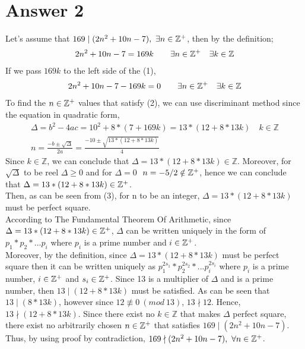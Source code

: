 \documentclass[12pt]{article}
\newcommand{\Z}{\mathbb{Z}}
\begin{document}
\section*{Answer 2}
Let's assume that $169 \mid (2n^2+10n-7),\ \exists n\in \Z\textsuperscript{+}$, then by the definition;
\begin{equation}
\begin{split}
2n^2+10n-7 = 169k \qquad \exists n\in \Z\textsuperscript{+} \quad \exists k \in \Z
\end{split}
\end{equation}
If we pass $169k$ to the left side of the (1),
\begin{equation}
\begin{split}
2n^2+10n-7-169k = 0 \qquad \exists n\in \Z\textsuperscript{+} \quad \exists k \in \Z
\end{split}
\end{equation}
To find the $n\in \Z\textsuperscript{+}$ values that satisfy (2), we can use discriminant method since the equation in quadratic form,
\begin{equation}
\begin{split}
\Delta = b^2-4ac = 10^2+8*(7+169k) = 13*(12 +8*13k) \quad k \in \Z \\
n = \frac{-b \pm \sqrt{\Delta}}{2a} = \frac{-10 \pm \sqrt{13*(12 +8*13k)}}{4} \qquad \qquad
\end{split}
\end{equation}
Since $k\in \Z$, we can conclude that $\Delta = 13*(12 +8*13k)\in \Z$. Moreover, for $\sqrt{\Delta}$ to be reel $\Delta \geq 0$ and for $\Delta = 0$ $\ n = -5/2 \notin \Z\textsuperscript{+}$, hence we can conclude that $\Delta = 13*(12 +8*13k)\in \Z\textsuperscript{+}$. \\
Then, as can be seen from (3), for n to be an integer, $\Delta = 13*(12 +8*13k)$ must be perfect square. \\
According to The Fundamental Theorem Of Arithmetic, since $\Delta = 13*(12 +8*13k)\in \Z\textsuperscript{+}$, $\Delta$ can be written uniquely in the form of $p_{1}*p_{2}*...p_{i}$ where $p_{i}$ is a prime number and $i\in \Z\textsuperscript{+}$.\\
Moreover, by the definition, since $\Delta = 13*(12 +8*13k)$ must be perfect square then it can be written uniquely as $p_{1}^{2s_{1}}*p_{2}^{2s_{2}}*...p_{i}^{2s_{i}}$ where $p_{i}$ is a prime number, $i\in \Z\textsuperscript{+}$ and $s_{i} \in \Z\textsuperscript{+}$.
Since 13 is a multiplier of $\Delta$ and is a prime number, then $13 \mid (12 +8*13k)$ must be satisfied. As can be seen that $13 \mid (8*13k)$, however since $12 \not\equiv 0 \ (mod \ 13)$, $13 \nmid 12$. Hence, $13 \nmid (12 +8*13k)$. Since there exist no $k\in \Z$ that makes $\Delta$ perfect square, there exist no arbitrarily chosen $n\in  \Z\textsuperscript{+}$ that satisfies $169 \mid (2n^2+10n-7)$. Thus, by using proof by contradiction, $169 \nmid (2n^2+10n-7),\ \forall n\in \Z\textsuperscript{+}$.
\end{document}
